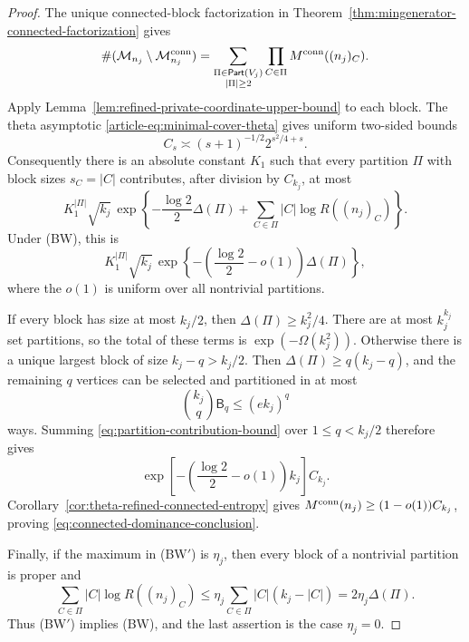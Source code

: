 \begin{proof}
The unique connected-block factorization in
Theorem~\ref{thm:mingenerator-connected-factorization} gives
\[
 \#(\mathcal M_{n_j}\setminus\mathcal M_{n_j}^{\rm conn})
 =\sum_{\substack{\Pi\in\mathsf{Part}(V_j)\\|\Pi|\ge2}}
   \prod_{C\in\Pi}M^{\rm conn}((n_j)_C).
\]
Apply Lemma~\ref{lem:refined-private-coordinate-upper-bound} to each block.
The theta asymptotic \eqref{article-eq:minimal-cover-theta} gives uniform two-sided
bounds
\[
 C_s\asymp(s+1)^{-1/2}2^{s^2/4+s}.
\]
Consequently there is an absolute constant $K_1$ such that every partition
$\Pi$ with block sizes $s_C=|C|$ contributes, after division by $C_{k_j}$,
at most
\begin{equation}\label{eq:partition-contribution-bound}
 K_1^{|\Pi|}\sqrt{k_j}\,
 \exp\left\{-\frac{\log2}{2}\Delta(\Pi)
 +\sum_{C\in\Pi}|C|\log R((n_j)_C)\right\}.
\end{equation}
Under \textup{(BW)}, this is
\[
 K_1^{|\Pi|}\sqrt{k_j}\,
 \exp\left\{-\left(\frac{\log2}{2}-o(1)\right)
 \Delta(\Pi)\right\},
\]
where the $o(1)$ is uniform over all nontrivial partitions.

If every block has size at most $k_j/2$, then
$\Delta(\Pi)\ge k_j^2/4$. There are at most $k_j^{k_j}$ set partitions,
so the total of these terms is $\exp(-\Omega(k_j^2))$. Otherwise there is a
unique largest block of size $k_j-q>k_j/2$. Then
$\Delta(\Pi)\ge q(k_j-q)$, and the remaining $q$ vertices can be selected and
partitioned in at most
\[
 \binom{k_j}{q}\mathsf B_q\le(ek_j)^q
\]
ways. Summing \eqref{eq:partition-contribution-bound} over
$1\le q<k_j/2$ therefore gives
\[
 \exp\left[-\left(\frac{\log2}{2}-o(1)\right)k_j\right]C_{k_j}.
\]
Corollary~\ref{cor:theta-refined-connected-entropy} gives
$M^{\rm conn}(n_j)\ge(1-o(1))C_{k_j}$, proving
\eqref{eq:connected-dominance-conclusion}.

Finally, if the maximum in \textup{(BW$'$)} is $\eta_j$, then every block of
a nontrivial partition is proper and
\[
 \sum_{C\in\Pi}|C|\log R((n_j)_C)
 \le\eta_j\sum_{C\in\Pi}|C|(k_j-|C|)
 =2\eta_j\Delta(\Pi).
\]
Thus \textup{(BW$'$)} implies \textup{(BW)}, and the last assertion is the
case $\eta_j=0$.
\end{proof}

